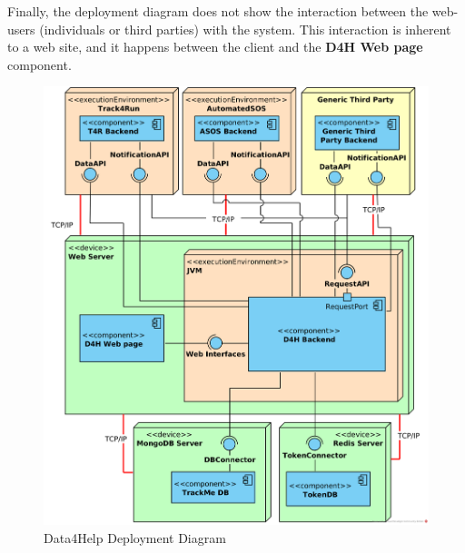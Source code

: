 \documentclass[a4paper, hidelinks, 12pt]{report}
\begin{document}
	Finally, the deployment diagram does not show the interaction between the web-users (individuals or third parties) with the system. This interaction is inherent to a web site, and it happens between the client and the \textbf{D4H Web page} component.
		\begin{figure}[H]
			\centering
			\includegraphics[width=1\textwidth]{diagrams/d4h_deployment_diagram.png}
			\caption[Data4Help Deployment Diagram]{Data4Help Deployment Diagram}
			\label{fig:d4h_deployment_diagram}
		\end{figure}	
		
\end{document}
